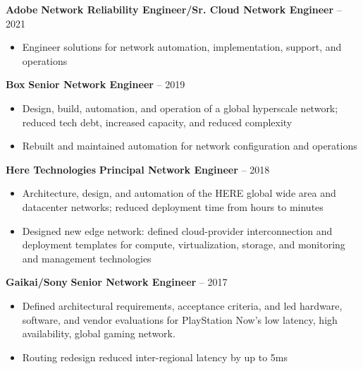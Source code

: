 \documentclass[11pt]{article}
\newcommand{\job}[3]{
    \begingroup
        \textbf{\small#1} \hfill \textbf{\small#2} \--- \color{black!70}\small{#3}
    \endgroup
}
\newcommand{\spacevv}{
    \vspace{2mm}
}
\begin{document}
\begin{paracol}{2}
{      \job{Adobe}{Network Reliability Engineer/Sr. Cloud Network Engineer}{2021\--2022}
      \begin{itemize}
        \item Engineer solutions for network automation, implementation, support, and operations
      \end{itemize}
      \spacevv{}

      \job{Box}{Senior Network Engineer}{2019}
      \begin{itemize}
        \item Design, build, automation, and operation of a global hyperscale network; reduced tech debt, increased
            capacity, and reduced complexity
        \item Rebuilt and maintained automation for network configuration and operations
      \end{itemize}

    \job{Here Technologies}{Principal Network Engineer}{2018}
    \begin{itemize}
        \item Architecture, design, and automation of the HERE global wide area and datacenter networks; reduced
            deployment time from hours to minutes
        \item Designed new edge network: defined cloud-provider interconnection and deployment templates for compute,
            virtualization, storage, and monitoring and management technologies
    \end{itemize}
    \spacevv{}

    \job{Gaikai/Sony}{Senior Network Engineer}{2017}
    \begin{itemize}
        \item Defined architectural requirements, acceptance criteria, and led hardware, software, and vendor
            evaluations for PlayStation Now's low latency, high availability, global gaming network.
        \item Routing redesign reduced inter-regional latency by up to 5ms
    \end{itemize}
    \spacevv{}

}
\end{paracol}
\end{document}
